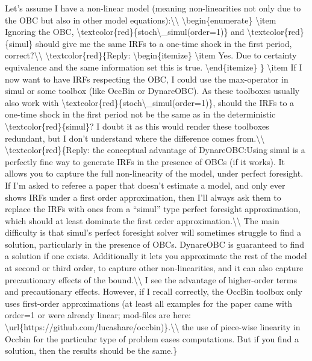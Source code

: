 \documentclass[10pt,math=newtx,citestyle=gb7714-2015,bibstyle=gb7714-2015]{elegantbook}
\begin{document}
	Let’s assume I have a non-linear model (meaning non-linearities not only due to the OBC but also in other model equations):\textbackslash{}\textbackslash{}
	\textbackslash{}begin\{enumerate\}
	\textbackslash{}item  Ignoring the OBC, \textbackslash{}textcolor\{red\}\{stoch\textbackslash{}\_simul(order=1)\} and \textbackslash{}textcolor\{red\}\{simul\} should give me the same IRFs to a one-time shock in the first period, correct?\textbackslash{}\textbackslash{}
	\textbackslash{}textcolor\{red\}\{Reply:
	\textbackslash{}begin\{itemize\}
	\textbackslash{}item Yes. Due to certainty equivalence and the same information set this is true.
	\textbackslash{}end\{itemize\}
	\}
	\textbackslash{}item If I now want to have IRFs respecting the OBC, I could use the max-operator in simul or some toolbox (like OccBin or DynareOBC). As these toolboxes usually also work with \textbackslash{}textcolor\{red\}\{stoch\textbackslash{}\_simul(order=1)\}, should the IRFs to a one-time shock in the first period not be the same as in the deterministic \textbackslash{}textcolor\{red\}\{simul\}? I doubt it as this would render these toolboxes redundant, but I don’t understand where the difference comes from.\textbackslash{}\textbackslash{}
	\textbackslash{}textcolor\{red\}\{Reply: the conceptual advantage of DynareOBC:Using simul is a perfectly fine way to generate IRFs in the presence of OBCs (if it works). It allows you to capture the full non-linearity of the model, under perfect foresight. If I’m asked to referee a paper that doesn’t estimate a model, and only ever shows IRFs under a first order approximation, then I’ll always ask them to replace the IRFs with ones from a “simul” type perfect foresight approximation, which should at least dominate the first order approximation.\textbackslash{}\textbackslash{}
	The main difficulty is that simul’s perfect foresight solver will sometimes struggle to find a solution, particularly in the presence of OBCs. DynareOBC is guaranteed to find a solution if one exists. Additionally it lets you approximate the rest of the model at second or third order, to capture other non-linearities, and it can also capture precautionary effects of the bound.\textbackslash{}\textbackslash{}
	I see the advantage of higher-order terms and precautionary effects. However, if I recall correctly, the OccBin toolbox only uses first-order approximations (at least all examples for the paper came with order=1 or were already linear; mod-files are here: \textbackslash{}url\{https://github.com/lucashare/occbin)\}.\textbackslash{}\textbackslash{}
	the use of piece-wise linearity in Occbin for the particular type of problem eases computations. But if you find a solution, then the results should be the same.\}
\end{document}
